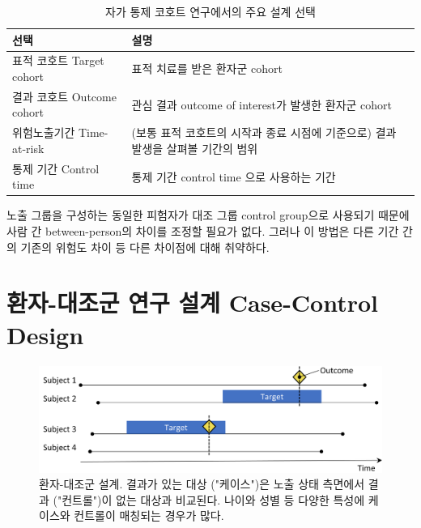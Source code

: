 \documentclass[10.5pt]{book}
\theoremstyle{definition}
\theoremstyle{definition}
\theoremstyle{definition}
\theoremstyle{remark}
\begin{document}
\begin{table}[t]

\caption{\label{tab:sccChoices}자가 통제 코호트 연구에서의 주요 설계 선택}
\centering
\begin{tabu} to 
\toprule
선택 & 설명\\
\midrule
표적 코호트 Target cohort & 표적 치료를 받은 환자군 cohort\\
결과 코호트 Outcome cohort & 관심 결과 outcome of interest가 발생한 환자군 cohort\\
위험노출기간 Time-at-risk & (보통 표적 코호트의 시작과 종료 시점에 기준으로) 결과 발생을 살펴볼 기간의 범위\\
통제 기간 Control time & 통제 기간 control time 으로 사용하는 기간\\
\bottomrule
\end{tabu}
\end{table}

노출 그룹을 구성하는 동일한 피험자가 대조 그룹 control group으로
사용되기 때문에 사람 간 between-person의 차이를 조정할 필요가 없다.
그러나 이 방법은 다른 기간 간의 기존의 위험도 차이 등 다른 차이점에 대해
취약하다.

\section{환자-대조군 연구 설계 Case-Control
Design}\label{----case-control-design}


\begin{figure}[h]

{\centering \includegraphics[width=0.9\linewidth]{images/PopulationLevelEstimation/caseControl} 

}

\caption{환자-대조군 설계. 결과가 있는 대상 ("케이스")은 노출 상태 측면에서 결과 ("컨트롤")이 없는 대상과 비교된다. 나이와 성별 등 다양한 특성에 케이스와 컨트롤이 매칭되는 경우가 많다.}\label{fig:caseControl}
\end{figure}
\end{document}
